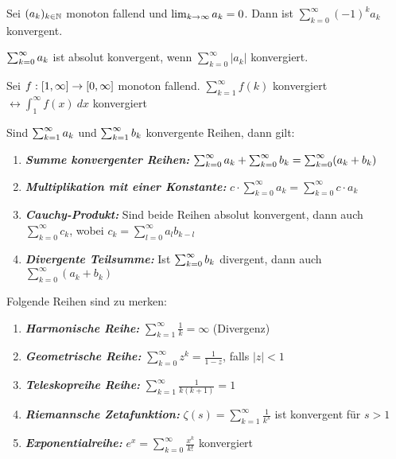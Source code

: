 \documentclass[]{article}
\begin{document}
\begin{satz}[Leibnizkriterium]
	Sei $(a_k)_{k \in \mathbb{N}}$ monoton fallend und $\lim_{k \rightarrow \infty} a_k = 0$. Dann ist $\sum_{k=0}^{\infty} (-1)^k a_k$ konvergent.
\end{satz}

\begin{definition}
	$\sum_{k = 0}^{\infty} a_{k}$ ist absolut konvergent, wenn 	$\sum_{k=0}^{\infty} | a_k | $ konvergiert.
\end{definition}

\begin{satz}[Integralkriterium]
	Sei $f : [1,\infty] \rightarrow [0, \infty]$ monoton fallend. 	$\sum_{k=1}^{\infty} f(k) $ konvergiert $\leftrightarrow \int_{1}^{\infty} f(x) \medspace dx $ konvergiert
\end{satz}

\begin{satz}
	Sind $\sum_{k = 1}^{\infty} a_{k}$ und $\sum_{k = 1}^{\infty} b_{k}$ konvergente Reihen, dann gilt:
	\begin{enumerate}[noitemsep]
		\item \emph{\textbf{Summe konvergenter Reihen:}} $\sum_{k = 0}^{\infty} a_{k} + \sum_{k = 0}^{\infty} b_{k} = \sum_{k=0}^{\infty} (a_k + b_k)$
		\item \emph{\textbf{Multiplikation mit einer Konstante:}} $c \cdot \sum_{k=0}^{\infty} a_k = \sum_{k=0}^{\infty} c \cdot a_k$
		\item \emph{\textbf{Cauchy-Produkt:}} Sind beide Reihen absolut konvergent, dann auch $\sum_{k=0}^{\infty} c_k$, wobei $c_k = \sum_{l=0}^{\infty} a_lb_{k-l}$
		\item \emph{\textbf{Divergente Teilsumme:}}  Ist $\sum_{k = 0}^{\infty} b_{k}$ divergent, dann auch $\sum_{k=0}^{\infty} (a_k + b_k) $
	\end{enumerate}
\end{satz}

\begin{satz}
	Folgende Reihen sind zu merken:
	\begin{enumerate}[noitemsep]
	\item \emph{\textbf{Harmonische Reihe:}} $\sum_{k=1}^{\infty} \frac{1}{k} = \infty$ (Divergenz)
	\item \emph{\textbf{Geometrische Reihe:}} $\sum_{k=0}^{\infty} z^k = \frac{1}{1 - z}$, falls $|z| < 1$
	\item \emph{\textbf{Teleskopreihe Reihe:}}  $\sum_{k=1}^{\infty} \frac{1}{k(k+1)} = 1$
	\item \emph{\textbf{Riemannsche Zetafunktion:}} $\zeta(s) = \sum_{k=1}^{\infty} \frac{1}{k^s}$ ist konvergent für $s>1$	
	\item \emph{\textbf{Exponentialreihe:}} $e^x = \sum_{k=0}^{\infty} \frac{x^k}{k!}$ konvergiert	
\end{enumerate}
\end{satz}
\end{document}
